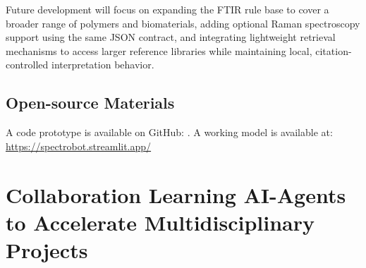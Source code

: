 Future development will focus on expanding the FTIR rule base to cover a broader range of polymers and biomaterials, adding optional Raman spectroscopy support using the same JSON contract, and integrating lightweight retrieval mechanisms to access larger reference libraries while maintaining local, citation-controlled interpretation behavior.

\subsection*{Open-source Materials}
A code prototype is available on GitHub: .  
A working model is available at: \url{https://spectrobot.streamlit.app/}








\section{Collaboration Learning AI-Agents to Accelerate Multidisciplinary Projects}

%

